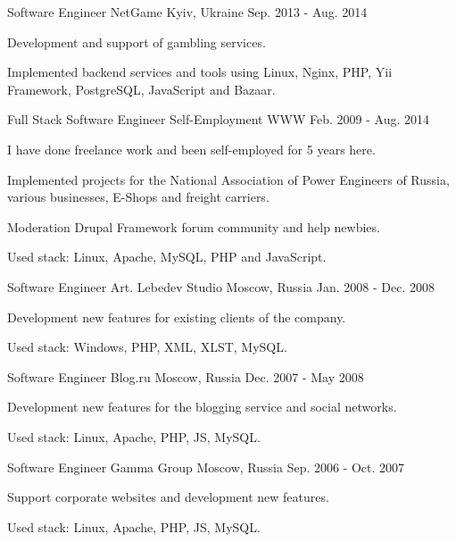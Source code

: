 \begin{cventries}
  \cventry
    {Software Engineer}
    {NetGame}
    {Kyiv, Ukraine}
    {Sep. 2013 - Aug. 2014}
    {
      \begin{cvitems}
        \item {Development and support of gambling services.}
        \item {Implemented backend services and tools using Linux, Nginx, PHP, Yii Framework, PostgreSQL, JavaScript and Bazaar.}
      \end{cvitems}
    }

  \cventry
    {Full Stack Software Engineer}
    {Self-Employment}
    {WWW}
    {Feb. 2009 - Aug. 2014}
    {
      \begin{cvitems}
        \item {I have done freelance work and been self-employed for 5 years here.}
        \item {Implemented projects for the National Association of Power Engineers of Russia, various businesses, E-Shops and freight carriers.}
        \item {Moderation Drupal Framework forum community and help newbies.}
        \item {Used stack: Linux, Apache, MySQL, PHP and JavaScript.}
      \end{cvitems}
    }

  \cventry
    {Software Engineer}
    {Art. Lebedev Studio}
    {Moscow, Russia}
    {Jan. 2008 - Dec. 2008}
    {
      \begin{cvitems}
        \item {Development new features for existing clients of the company.}
        \item {Used stack: Windows, PHP, XML, XLST, MySQL.}
      \end{cvitems}
    }

  \cventry
    {Software Engineer}
    {Blog.ru}
    {Moscow, Russia}
    {Dec. 2007 - May 2008}
    {
      \begin{cvitems}
        \item {Development new features for the blogging service and social networks.}
        \item {Used stack: Linux, Apache, PHP, JS, MySQL.}
      \end{cvitems}
    }

  \cventry
    {Software Engineer}
    {Gamma Group}
    {Moscow, Russia}
    {Sep. 2006 - Oct. 2007}
    {
      \begin{cvitems}
        \item {Support corporate websites and development new features.}
        \item {Used stack: Linux, Apache, PHP, JS, MySQL.}
      \end{cvitems}
    }


\end{cventries}
